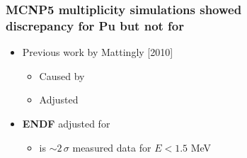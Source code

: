 \begin{frame}
    \frametitle{MCNP5 multiplicity simulations showed  \\discrepancy for
        Pu but not for }
\begin{minipage}{0.41\textwidth}
\begin{figure}[ht!]
\begin{center}
\end{center}
\end{figure} 
\begin{figure}[ht!]
\begin{center}
\end{center}
\end{figure} 

\end{minipage}
\begin{minipage}{0.56\textwidth}
    {\fontsize{10.8pt}{10pt}\selectfont
    \addtolength\leftmargini{-0.5in}
     \addtolength\leftmarginii{-0.2in}
     \addtolength\wideitemsep{0.1in}
\begin{itemize}
  \item[] Previous work by Mattingly [2010]
      \vspace{-0.1in}
  \begin{itemize}
      \item Caused by \textbf{}  
	\vspace{-0.1505in}
	\item  Adjusted 	
	\end{itemize}
\item[]  \textbf{ENDF} adjusted \nubar for  \\ 
    \vspace{0.1in}
  \begin{itemize}
 		\item \nubar is $\sim2\,\sigma$  measured data for $E < 1.5$ MeV 
	\end{itemize} 
\end{itemize} }
\end{minipage}
\end{frame} 
